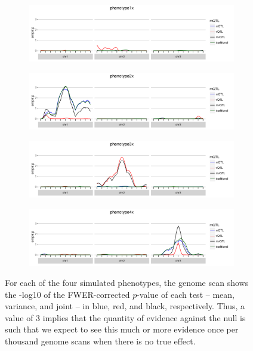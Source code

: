 \documentclass[9pt,twocolumn,twoside]{gsag3jnl}
\begin{document}
\begin{figure}[ht!]
    \begin{subfigure}{0.5\textwidth}
        \includegraphics[width=\textwidth]{images/empir_p_scan_phenotype1x.pdf}
    \end{subfigure}

    \begin{subfigure}[b]{0.5\textwidth}
        \includegraphics[width=\textwidth]{images/empir_p_scan_phenotype2x.pdf}
    \end{subfigure}

    \begin{subfigure}[b]{0.5\textwidth}
        \includegraphics[width=\textwidth]{images/empir_p_scan_phenotype3x.pdf}
    \end{subfigure}
    
    \begin{subfigure}[b]{0.5\textwidth}
        \includegraphics[width=\textwidth]{images/empir_p_scan_phenotype4x.pdf}
    \end{subfigure}
    
    \caption{For each of the four simulated phenotypes, the genome scan shows the -log10 of the FWER-corrected $p$-value of each test -- mean, variance, and joint -- in blue, red, and black, respectively. Thus, a value of 3 implies that the quantity of evidence against the null is such that we expect to see this much or more evidence once per thousand genome scans when there is no true effect. \label{fig:apdx_empir_p_scans}}
\end{figure}
\end{document}
